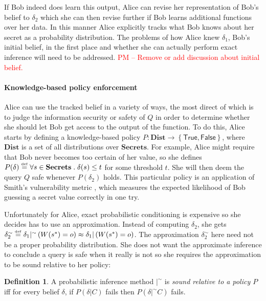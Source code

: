 \documentclass{article} %
\newcommand{\pxm}[1]{\textcolor{red}{PM -- #1}}
\newcommand{\ra}{\rightarrow}
\newcommand{\secrets}[0]{\textbf{Secrets}}
\newcommand{\asecret}[0]{s}
\newcommand{\rsecret}[0]{\asecret^*}
\newcommand{\dists}[0]{\textbf{Dist}}
\newcommand{\sconst}[1]{\ensuremath{\mathsf{#1}}}
\newcommand{\strue}{\sconst{True}}
\newcommand{\sfalse}{\sconst{False}}
\newcommand{\paren}[1]{\left( #1 \right)}
\newcommand{\set}[1]{\left\{ #1 \right\}}
\newcommand{\acond}[0]{|^\sim}
\newcommand{\qsep}[0]{\; . \;}
\newcommand{\stacklabel}[1]{\stackrel{\smash{\scriptscriptstyle \mathrm{#1}}}}
\newcommand{\defeq}{\stacklabel{def}=}
\theoremstyle{plain} %
\theoremstyle{definition} %
\newtheorem*{definition-un}{Definition}
\begin{document}
If Bob indeed does learn this output, Alice can revise her
representation of Bob's belief to $ \delta_2 $ which she can then
revise further if Bob learns additional functions over her data. In
this manner Alice explicitly tracks what Bob knows about her secret
as a probability distribution. The problems of how Alice knew $
\delta_1 $, Bob's initial belief, in the first place and whether she
can actually perform exact inference will need to be
addressed. \pxm{Remove or add discussion about initial belief.}

\paragraph{Knowledge-based policy enforcement}
Alice can use the tracked belief in a variety of ways, the most direct
of which is to judge the information security or safety of $ Q $ in
order to determine whether she should let Bob get access to the output
of the function. To do this, Alice starts by defining a
knowledge-based policy $ P : \dists \ra \set{\strue,\sfalse} $, where
$ \dists $ is a set of all distributions over $ \secrets $. For
example, Alice might require that Bob never becomes too certain of her
value, so she defines $ P(\delta) \defeq \forall \asecret \in \secrets \qsep
\delta(\asecret) \leq t $ for some threshold $ t $. She will then deem the
query $ Q $ safe whenever $ P(\delta_2) $ holds. This particular
policy is an application of Smith's vulnerability metric
\cite{smith09foundations}, which measures the expected likelihood of
Bob guessing a secret value correctly in one try.

Unfortunately for Alice, exact probabilistic conditioning is expensive
so she decides has to use an approximation. Instead of computing $
\delta_2 $, she gets $ \delta_2^\sim \defeq \delta_1 \acond
\paren{W(\rsecret) = o} \approx \delta_1 | \paren{W(\rsecret) = o} $. The
approximation $ \delta_2^\sim $ here need not be a proper probability
distribution. She does not want the approximate inference to conclude
a query is safe when it really is not so she requires the
approximation to be sound relative to her policy:

\begin{definition-un} A probabilistic inference method $ |^\sim $ is
  \emph{sound relative to a policy $ P $} iff for every belief $
  \delta $, if $ P(\delta | C) $ fails then $ P(\delta |^\sim C) $
  fails.
\end{definition-un}
\end{document}
